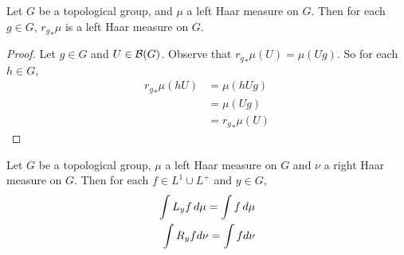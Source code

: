 \documentclass{book}
\begin{document}
	\begin{ex}  
		Let $G$ be a topological group, and $\mu$ a left Haar measure on $G$. Then for each $g \in G$, ${r_{g}}_*\mu$ is a left Haar measure on $G$.
	\end{ex}

	\begin{proof}
		Let $g \in G$ and $U \in \mathcal{B}(G)$. Observe that ${r_{g}}_*\mu(U) = \mu(Ug)$. So for each $h \in G$, 
		\begin{align*}
			{r_{g}}_*\mu(hU) 
			& = \mu(hUg) \\
			& =  \mu(Ug) \\
			& = {r_{g}}_*\mu(U)
		\end{align*}
	\end{proof}
	
	\begin{ex}  
		Let $G$ be a topological group, $\mu$ a left Haar measure on $G$ and $\nu$ a right Haar measure on $G$. Then for each $f \in L^1 \cup L^+$ and $y \in G$, 
		\begin{align}
			\int L_y f \, d \mu = \int f \, d \mu \\
			\int R_y f d\nu = \int f d\nu
		\end{align}
	\end{ex}
	
\end{document}
